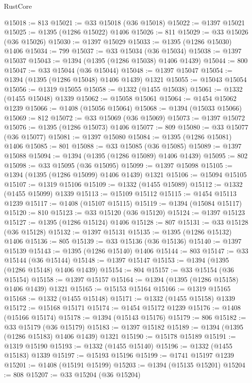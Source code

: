 \begin{lexlean}{RustCore}
\begin{coremodule}
@15018 := 813
@15021 := @33 @15018 (@36 @15018)
@15022 := @1397 @15021
@15025 := @1395 (@1286 @15022) @1406
@15026 := 811
@15029 := @33 @15026 (@36 @15026)
@15030 := @1397 @15029
@15033 := @1395 (@1286 @15030) @1406
@15034 := 799
@15037 := @33 @15034 (@36 @15034)
@15038 := @1397 @15037
@15043 := @1394 (@1395 (@1286 @15038) @1406 @1439)
@15044 := 800
@15047 := @33 @15044 (@36 @15044)
@15048 := @1397 @15047
@15054 := @1394 (@1395 (@1286 @15048) @1406 @1439) @1321
@15055 := @15043 @15054
@15056 := @1319 @15055
@15058 := @1332 (@1455 @15038)
@15061 := @1332 (@1455 @15048) @1339
@15062 := @15058 @15061
@15064 := @1454 @15062 @1239
@15066 := @1408 (@15056 @15064)
@15068 := @1394 (@15033 @15066)
@15069 := 812
@15072 := @33 @15069 (@36 @15069)
@15073 := @1397 @15072
@15076 := @1395 (@1286 @15073) @1406
@15077 := 809
@15080 := @33 @15077 (@36 @15077)
@15081 := @1397 @15080
@15084 := @1395 (@1286 @15081) @1406
@15085 := 801
@15088 := @33 @15085 (@36 @15085)
@15089 := @1397 @15088
@15094 := @1394 (@1395 (@1286 @15089) @1406 @1439)
@15095 := 802
@15098 := @33 @15095 (@36 @15095)
@15099 := @1397 @15098
@15105 := @1394 (@1395 (@1286 @15099) @1406 @1439) @1321
@15106 := @15094 @15105
@15107 := @1319 @15106
@15109 := @1332 (@1455 @15089)
@15112 := @1332 (@1455 @15099) @1339
@15113 := @15109 @15112
@15115 := @1454 @15113 @1239
@15117 := @1408 (@15107 @15115)
@15119 := @1394 (@15084 @15117)
@15120 := 810
@15123 := @33 @15120 (@36 @15120)
@15124 := @1397 @15123
@15127 := @1395 (@1286 @15124) @1406
@15128 := 807
@15131 := @33 @15128 (@36 @15128)
@15132 := @1397 @15131
@15135 := @1395 (@1286 @15132) @1406
@15136 := 805
@15139 := @33 @15136 (@36 @15136)
@15140 := @1397 @15139
@15143 := @1395 (@1286 @15140) @1406
@15144 := 803
@15147 := @33 @15144 (@36 @15144)
@15148 := @1397 @15147
@15153 := @1394 (@1395 (@1286 @15148) @1406 @1439)
@15154 := 804
@15157 := @33 @15154 (@36 @15154)
@15158 := @1397 @15157
@15164 := @1394 (@1395 (@1286 @15158) @1406 @1439) @1321
@15165 := @15153 @15164
@15166 := @1319 @15165
@15168 := @1332 (@1455 @15148)
@15171 := @1332 (@1455 @15158) @1339
@15172 := @15168 @15171
@15174 := @1454 @15172 @1239
@15176 := @1408 (@15166 @15174)
@15178 := @1394 (@15143 @15176)
@15179 := 806
@15182 := @33 @15179 (@36 @15179)
@15183 := @1397 @15182
@15189 := @1394 (@1395 (@1286 @15183) @1406 @1439) @1321
@15190 := @15178 @15189
@15191 := @1319 @15190
@15193 := @1332 (@1455 @15140)
@15196 := @1332 (@1455 @15183) @1339
@15197 := @15193 @15196
@15199 := @1741 @15197 @1239
@15201 := @1408 (@15191 @15199)
@15203 := @1394 (@15135 @15201)
@15204 := 808
@15207 := @33 @15204 (@36 @15204)

\end{coremodule}
\end{lexlean}
